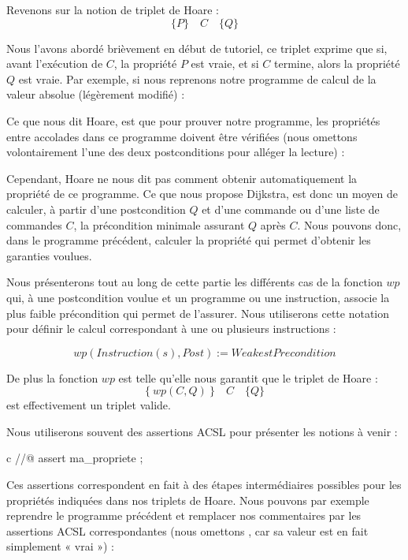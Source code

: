 Revenons sur la notion de triplet de Hoare :
$$\{ P \}\quad  C\quad \{ Q \}$$


Nous l'avons abordé brièvement en début de tutoriel, ce triplet exprime que si,
avant l'exécution de $C$, la propriété $P$ est vraie, et si $C$ termine, alors la
propriété $Q$ est vraie. Par exemple, si nous reprenons notre programme de
calcul de la valeur absolue (légèrement modifié) :






Ce que nous dit Hoare, est que pour prouver notre programme, les propriétés
entre accolades dans ce programme doivent être vérifiées (nous omettons
volontairement l'une des deux postconditions pour alléger la lecture) :






Cependant, Hoare ne nous dit pas comment obtenir automatiquement la
propriété  de ce programme. Ce que nous propose Dijkstra, est donc
un moyen de calculer, à partir d'une postcondition $Q$ et d'une commande ou d'une
liste de commandes $C$, la précondition minimale assurant $Q$ après $C$. Nous
pouvons donc, dans le programme précédent, calculer la propriété 
qui permet d'obtenir les garanties voulues.



Nous présenterons tout au long de cette partie les différents cas de la
fonction $wp$ qui, à une postcondition voulue et un programme ou une instruction,
associe la plus faible précondition qui permet de l'assurer. Nous utiliserons
cette notation pour définir le calcul correspondant à une ou plusieurs instructions :



$$wp(Instruction(s), Post) := WeakestPrecondition$$



De plus la fonction $wp$ est telle qu'elle nous garantit que le triplet de Hoare :
$$\{\ wp(C,Q)\ \}\quad C\quad \{ Q \}$$
est effectivement un triplet valide.



Nous utiliserons souvent des assertions ACSL pour présenter les notions à
venir :



\begin{CodeBlock}{c}
//@ assert ma_propriete ;
\end{CodeBlock}



Ces assertions correspondent en fait à des étapes intermédiaires possibles pour
les propriétés indiquées dans nos triplets de Hoare. Nous pouvons par exemple
reprendre le programme précédent et remplacer nos commentaires par les assertions
ACSL correspondantes (nous omettons , car sa valeur est en fait
simplement « vrai ») :




